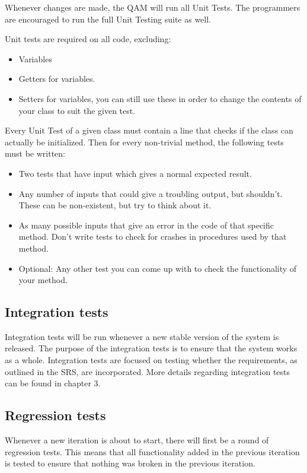 \documentclass[salesmen, twoside]{../../../templates/latex/2009/softproj}
\begin{document}
\begin{projdoc}
Whenever changes are made, the QAM will run all Unit Tests. The programmers are encouraged to run the full Unit Testing suite as well.

Unit tests are required on all code, excluding:
\begin{itemize}
\item
Variables
\item
Getters for variables.
\item
Setters for variables, you can still use these in order to change the contents of your class to suit the given test.
\end{itemize}

Every Unit Test of a given class must contain a line that checks if the class can actually be initialized. Then for every non-trivial method, the following tests must be written:
\begin{itemize}
\item
Two tests that have input which gives a normal expected result.
\item
Any number of inputs that could give a troubling output, but shouldn't. These can be non-existent, but try to think about it.
\item
As many possible inputs that give an error in the code of that specific method. Don't write tests to check for crashes in procedures used by that method.
\item
Optional: Any other test you can come up with to check the functionality of your method.
\end{itemize}

\subsection{Integration tests}
Integration tests will be run whenever a new stable version of the system is released. The purpose of the integration tests is to ensure that the system works as a whole. Integration tests are focused on testing whether the requirements, as outlined in the SRS\cite{SRS}, are incorporated. More details regarding integration tests can be found in chapter 3.

\subsection{Regression tests}
Whenever a new iteration is about to start, there will first be a round of regression tests. This means that all functionality added in the previous iteration is tested to ensure that nothing was broken in the previous iteration.


\end{projdoc}
\end{document}
